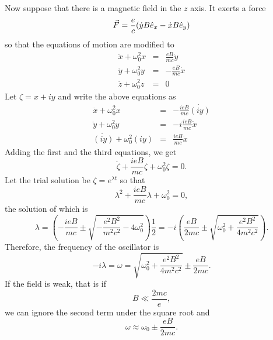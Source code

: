\begin{enumerate}
Now suppose that there is a magnetic field in the $z$ axis. It exerts a force
\[
\vec{F} = \frac{e}{c}(\dot{y} B\hat{e}_{x} - \dot{x}B\hat{e}_{y})
\]
so that the equations of motion are modified to
\begin{eqnarray*}
\ddot{x} + \omega_0^2 x &=& \frac{eB}{mc}\dot{y} \\
\ddot{y} + \omega_0^2 y &=& -\frac{eB}{mc}\dot{x}\\
\ddot{z} + \omega_0^2 z &=& 0
\end{eqnarray*}
Let $\zeta = x + iy$ and write the above equations as
\begin{eqnarray*}
\ddot{x} + \omega_0^2 x &=& -\frac{ieB}{mc}\dot{(iy)} \\
\ddot{y} + \omega_0^2 y &=& -i\frac{ieB}{mc}\dot{x} \\
\ddot{(iy)} + \omega_0^2 (iy) &=& \frac{ieB}{mc}\dot{x}
\end{eqnarray*}
Adding the first and the third equations, we get
\[
\ddot{\zeta} + \frac{ieB}{mc}\zeta + \omega_0^2\zeta = 0.
\]
Let the trial solution be $\zeta = e^{\lambda t}$ so that 
\[
\lambda^2 + \frac{ieB}{mc}\lambda + \omega_0^2 = 0,
\]
the solution of which is
\[
\lambda = \left(-\frac{ieB}{mc} \pm \sqrt{-\frac{e^2B^2}{m^2c^2} - 4\omega_0^2}\right)
\frac{1}{2} = -i\left(\frac{eB}{2mc} \pm \sqrt{\omega_0^2 + \frac{e^2B^2}{4m^2c^2}}\right).
\]
Therefore, the frequency of the oscillator is
\[
-i\lambda = \omega = \sqrt{\omega_0^2 + \frac{e^2B^2}{4m^2c^2}} \pm \frac{eB}{2mc}.
\]
If the field is weak, that is if
\[
B \ll \frac{2mc}{e},
\]
we can ignore the second term under the square root and
\[
\omega \approx \omega_0 \pm \frac{eB}{2mc}.
\]


\end{enumerate}
